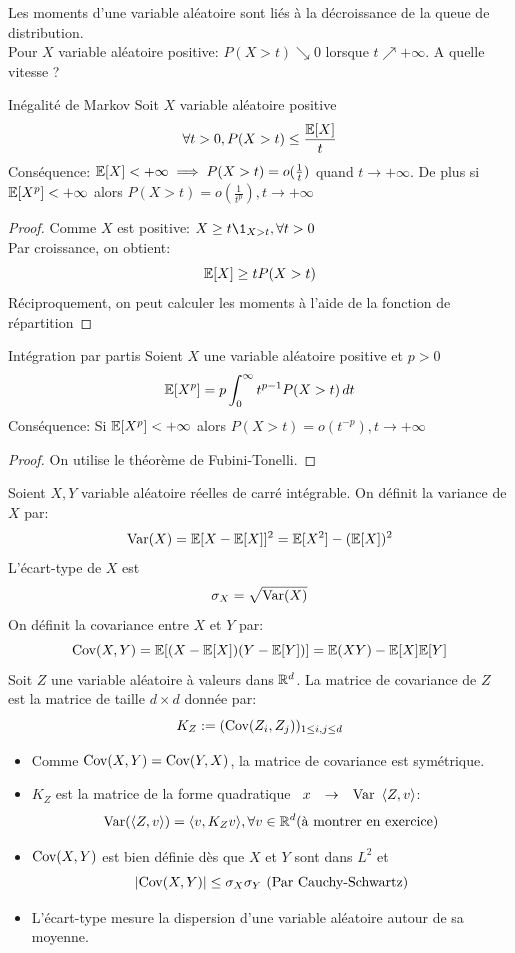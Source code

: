 \documentclass[]{report}
\begin{document}
    Les moments d'une variable aléatoire sont liés à la décroissance de la queue de distribution.\\
    Pour $X$ variable aléatoire positive: $P(X>t)\searrow 0$ lorsque $t\nearrow+\infty$. A quelle vitesse ?

    \begin{tm}{Inégalité de Markov}{}
        Soit $X$ variable aléatoire positive 
        \[\forall t>0, P(X>t)\le \frac{\mathbb{E}[X]}{t}\]
        Conséquence: $\mathbb{E}[X]<+\infty\implies P(X>t)=o(\frac{1}{t})$ quand $t\to+\infty$. De plus si $\mathbb{E}[X^p]<+\infty$ alors $P(X>t)=o(\frac{1}{t^p}),t\to+\infty$
    \end{tm}

    \begin{proof}
        Comme $X$ est positive: $X\ge t\1_{X>t},\forall t>0$\\
        Par croissance, on obtient:
        \[\mathbb{E}[X]\ge tP(X>t)\]
        Réciproquement, on peut calculer les moments à l'aide de la fonction de répartition
    \end{proof}

    \begin{prop}{Intégration par partis}{}
        Soient $X$ une variable aléatoire positive et $p>0$
        \[\mathbb{E}[X^p]=p\int_{0}^{\infty} t^{p-1}P(X>t)\,dt\]
        Conséquence: Si $\mathbb{E}[X^p]<+\infty$ alors $P(X>t)=o(t^{-p}),t\to+\infty$
    \end{prop}

    \begin{proof}
        On utilise le théorème de Fubini-Tonelli.
    \end{proof}

    \begin{df}{}{}
        Soient $X,Y$ variable aléatoire réelles de carré intégrable. On définit la variance de $X$ par:
        \[\text{Var}(X)=\mathbb{E}[X-\mathbb{E}[X]]^2=\mathbb{E}[X^2]-(\mathbb{E}[X])^2\]
        L'écart-type de $X$ est 
        \[\sigma_X=\sqrt{\text{Var}(X)}\]
        On définit la covariance entre $X$ et $Y$ par:
        \[\text{Cov}(X,Y)=\mathbb{E}[(X-\mathbb{E}[X])(Y-\mathbb{E}[Y])]=\mathbb{E}(XY)-\mathbb{E}[X]\mathbb{E}[Y]\]
        Soit $Z$ une variable aléatoire à valeurs dans $\mathbb{R}^d$. La matrice de covariance de $Z$ est la matrice de taille $d\times d$ donnée par:
        \[K_Z:=(\text{Cov}(Z_i,Z_j))_{1\le i,j\le d}\]
    \end{df}

    \begin{re}{}{}
        \begin{itemize}
            \item Comme $\text{Cov}(X,Y)=\text{Cov}(Y,X)$, la matrice de covariance est symétrique.
            \item $K_Z$ est la matrice de la forme quadratique $\begin{array}{ccccc} x & \to & \text{Var} \end{array}\langle Z,v \rangle$:
            \[\text{Var}(\langle Z,v \rangle)=\langle v,K_{Z}v \rangle,\forall v\in \mathbb{R}^d\text{(à montrer en exercice)}\]
            \item $\text{Cov}(X,Y)$ est bien définie dès que $X$ et $Y$ sont dans $L^2$ et
            \[|\text{Cov}(X,Y)|\le\sigma_X\sigma_Y\text{ (Par Cauchy-Schwartz)}\]
            \item L'écart-type mesure la dispersion d'une variable aléatoire autour de sa moyenne.
        \end{itemize}
    \end{re}
\end{document}
